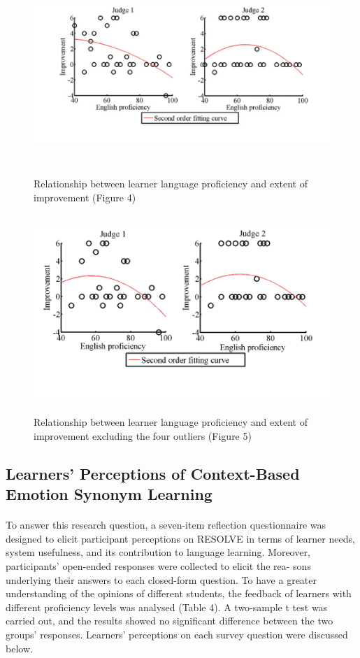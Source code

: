 \documentclass[a4paper,12pt,oneside]{article}
\let\counterwithin\relax
\begin{document}
\begin{figure}[H]
\includegraphics[height=7.5cm,width=16cm]{Figure4.png}
\centering
\caption{Relationship between learner language proficiency and extent of improvement (Figure 4)}
\end{figure}


\begin{figure}[H]
\includegraphics[height=7.5cm,width=16cm]{Figure5.png}
\centering
\caption{Relationship between learner language proficiency and extent of improvement excluding the four outliers (Figure 5)}
\end{figure}

\subsection{Learners’ Perceptions of Context-Based Emotion Synonym Learning}
\paragraph{}
To answer this research question, a seven-item reflection questionnaire was designed to elicit participant perceptions on RESOLVE in terms of learner needs, system usefulness, and its contribution to language learning. Moreover, participants’ open-ended responses were collected to elicit the rea- sons underlying their answers to each closed-form question. To have a greater understanding of the opinions of different students, the feedback of learners with different proficiency levels was analysed (Table 4). A two-sample t test was carried out, and the results showed no significant difference between the two groups’ responses. Learners’ perceptions on each survey question were discussed below. 
\end{document}
